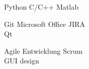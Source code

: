 Python \textbullet{} C/C++ \textbullet{} Matlab
\Sep

Git \textbullet{} Microsoft Office \textbullet{} JIRA\\ Qt 
\Sep

Agile Entwicklung \textbullet{} Scrum\\
GUI design 
\last
